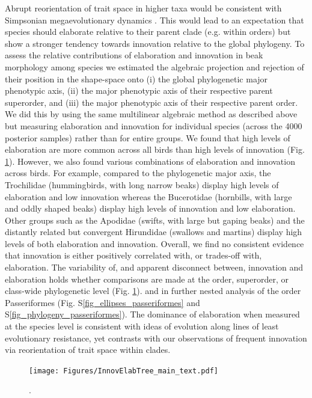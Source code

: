 \documentclass[12pt,letterpaper]{article}
\begin{document}
Abrupt reorientation of trait space in higher taxa would be consistent with Simpsonian megaevolutionary dynamics \cite{simpson1953major}.
This would lead to an expectation that species should elaborate relative to their parent clade (e.g. within orders) but show a stronger tendency towards innovation relative to the global phylogeny.
To assess the relative contributions of elaboration and innovation in beak morphology among species we estimated the algebraic projection and rejection of their position in the shape-space onto (i) the global phylogenetic major phenotypic axis, (ii) the major phenotypic axis of their respective parent superorder, and (iii) the major phenotypic axis of their respective parent order.
We did this by using the same multilinear algebraic method as described above but measuring elaboration and innovation for individual species (across the 4000 posterior samples) rather than for entire groups.
We found that high levels of elaboration are more common across all birds than high levels of innovation (Fig. \ref{Fig:phylogeny}).
However, we also found various combinations of elaboration and innovation across birds.
For example, compared to the phylogenetic major axis, the Trochilidae (hummingbirds, with long narrow beaks) display high levels of elaboration and low innovation whereas the Bucerotidae (hornbills, with large and oddly shaped beaks) display high levels of innovation and low elaboration.
Other groups such as the Apodidae (swifts, with large but gaping beaks) and the distantly related but convergent Hirundidae (swallows and martins) display high levels of both elaboration and innovation.
Overall, we find no consistent evidence that innovation is either positively correlated with, or trades-off with, elaboration. %
The variability of, and apparent disconnect between, innovation and elaboration holds whether comparisons are made at the order, superorder, or class-wide phylogenetic level (Fig. \ref{Fig:phylogeny}). %
 and in further nested analysis of the order Passeriformes (Fig. S\ref{fig_ellipses_passeriformes} and S\ref{fig_phylogeny_passeriformes}).
The dominance of elaboration when measured at the species level is consistent with ideas of evolution along lines of least evolutionary resistance, yet contrasts with our observations of frequent innovation via reorientation of trait space within clades.

\begin{figure}[!htbp]
\centering
    \texttt{[image: Figures/InnovElabTree\_main\_text.pdf]}
\caption{.}
\label{Fig:phylogeny}
\end{figure}
\end{document}
